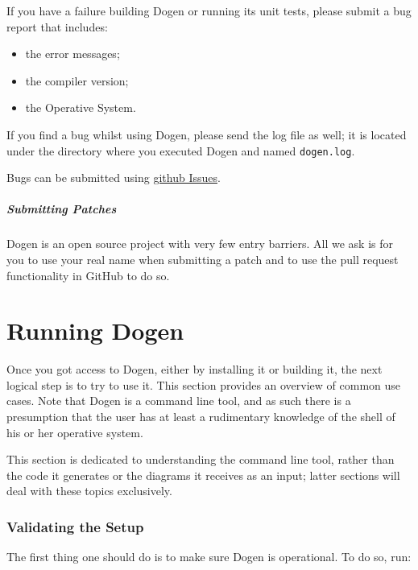 \documentclass{book}
\begin{document}
If you have a failure building Dogen or running its unit tests, please
submit a bug report that includes:

\begin{itemize}
\item the error messages;
\item the compiler version;
\item the Operative System.
\end{itemize}

If you find a bug whilst using Dogen, please send the log file as
well; it is located under the directory where you executed Dogen and
named \texttt{dogen.log}.

Bugs can be submitted using
\href{https://github.com/kitanda/dogen/issues}{github Issues}.

\paragraph{Submitting Patches}

Dogen is an open source project with very few entry barriers. All we
ask is for you to use your real name when submitting a patch and to
use the pull request functionality in GitHub to do so.

\chapter{Running Dogen}

Once you got access to Dogen, either by installing it or building it,
the next logical step is to try to use it. This section provides an
overview of common use cases. Note that Dogen is a command line tool,
and as such there is a presumption that the user has at least a
rudimentary knowledge of the shell of his or her operative system.

This section is dedicated to understanding the command line tool,
rather than the code it generates or the diagrams it receives as an
input; latter sections will deal with these topics exclusively.

\subsection{Validating the Setup}

The first thing one should do is to make sure Dogen is operational. To
do so, run:

\end{document}
